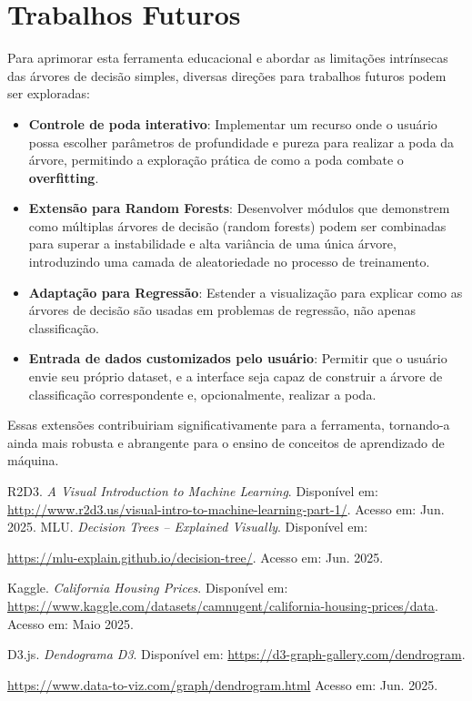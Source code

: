 \documentclass[conference]{IEEEtran}
\begin{document}
\section{Trabalhos Futuros}
Para aprimorar esta ferramenta educacional e abordar as limitações intrínsecas das árvores de decisão simples, diversas direções para trabalhos futuros podem ser exploradas:
\begin{itemize}
    \item \textbf{Controle de poda interativo}: Implementar um recurso onde o usuário possa escolher parâmetros de profundidade e pureza para realizar a poda da árvore, permitindo a exploração prática de como a poda combate o \textbf{overfitting}.
    \item \textbf{Extensão para Random Forests}: Desenvolver módulos que demonstrem como múltiplas árvores de decisão (random forests) podem ser combinadas para superar a instabilidade e alta variância de uma única árvore, introduzindo uma camada de aleatoriedade no processo de treinamento.
    \item \textbf{Adaptação para Regressão}: Estender a visualização para explicar como as árvores de decisão são usadas em problemas de regressão, não apenas classificação.
    \item \textbf{Entrada de dados customizados pelo usuário}: Permitir que o usuário envie seu próprio dataset, e a interface seja capaz de construir a árvore de classificação correspondente e, opcionalmente, realizar a poda.
\end{itemize}
Essas extensões contribuiriam significativamente para a ferramenta, tornando-a ainda mais robusta e abrangente para o ensino de conceitos de aprendizado de máquina.

\begin{thebibliography}{00}
 R2D3. \textit{A Visual Introduction to Machine Learning}. Disponível em: \url{http://www.r2d3.us/visual-intro-to-machine-learning-part-1/}. Acesso em: Jun. 2025.
 MLU. \textit{Decision Trees – Explained Visually}. Disponível em:

\url{https://mlu-explain.github.io/decision-tree/}. Acesso em: Jun. 2025.

 Kaggle. \textit{California Housing Prices}. Disponível em: \url{https://www.kaggle.com/datasets/camnugent/california-housing-prices/data}. Acesso em: Maio 2025.

 D3.js. \textit{Dendograma D3}. Disponível em: \url{https://d3-graph-gallery.com/dendrogram}.

\url{https://www.data-to-viz.com/graph/dendrogram.html}
Acesso em: Jun. 2025.

\end{thebibliography}
\end{document}
